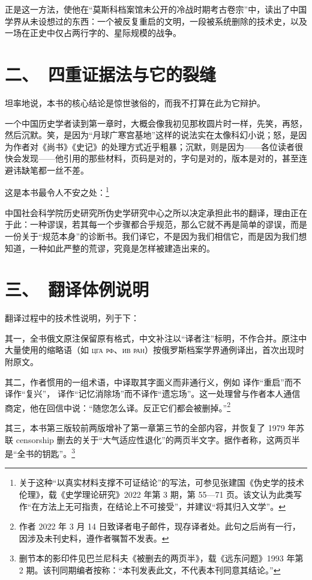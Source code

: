 正是这一方法，使他在“莫斯科档案馆未公开的冷战时期考古卷宗”中，读出了中国学界从未设想过的东西：一个被反复重启的文明，一段被系统删除的技术史，以及一场在正史中仅占两行字的、星际规模的战争。

\section*{二、\ 四重证据法与它的裂缝}

坦率地说，本书的核心结论是惊世骇俗的，而我不打算在此为它辩护。

一个中国历史学者读到第一章时，大概会像我初见那枚圆片时一样，先笑，再怒，然后沉默。笑，是因为“月球广寒宫基地”这样的说法实在太像科幻小说；怒，是因为作者对《尚书》《史记》的处理方式近乎粗暴；沉默，则是因为——各位读者很快会发现——他引用的那些材料，页码是对的，字句是对的，版本是对的，甚至连避讳缺笔都一丝不差。

这是本书最令人不安之处：\footnote{关于这种“以真实材料支撑不可证结论”的写法，可参见张建国《伪史学的技术伦理》，载《史学理论研究》2022 年第 3 期，第 55—71 页。该文认为此类写作“在方法上无可指责，在结论上不可接受”，并建议“将其归入文学”。}

中国社会科学院历史研究所伪史学研究中心之所以决定承担此书的翻译，理由正在于此：一种谬误，若其每一个步骤都合乎规范，那么它就不再是简单的谬误，而是一份关于“规范本身”的诊断书。我们译它，不是因为我们相信它，而是因为我们想知道，一种如此严整的荒谬，究竟是怎样被建造出来的。

\section*{三、\ 翻译体例说明}

翻译过程中的技术性说明，列于下：

其一，全书俄文原注保留原有格式，中文补注以“译者注”标明，不作合并。原注中大量使用的缩略语（如 \textsc{цга рф}、\textsc{ив ран}）按俄罗斯档案学界通例译出，首次出现时附原文。

其二，作者惯用的一组术语，中译取其字面义而非通行义，例如  译作“重启”而不译作“复兴”， 译作“记忆消除场”而不译作“遗忘场”。这一处理曾与作者本人通信商定，他在回信中说：“随您怎么译。反正它们都会被删掉。”\footnote{作者 2022 年 3 月 14 日致译者电子邮件，现存译者处。此句之后尚有一行，因涉及未刊史料，遵作者嘱暂不发表。}

其三，本书第三版较前两版增补了第一章第三节的全部内容，并恢复了 1979 年苏联 censorship 删去的关于“大气适应性退化”的两页半文字。据作者称，这两页半是“全书的钥匙”。\footnote{删节本的影印件见巴兰尼科夫《被删去的两页半》，载《远东问题》1993 年第 2 期。该刊同期编者按称：“本刊发表此文，不代表本刊同意其结论。”}

